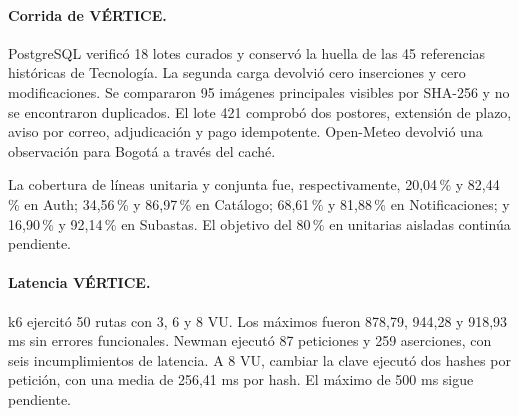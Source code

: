 \paragraph{Corrida de VÉRTICE.}
PostgreSQL verificó 18 lotes curados y conservó la huella de las 45 referencias históricas de Tecnología. La segunda carga devolvió cero inserciones y cero modificaciones. Se compararon 95 imágenes principales visibles por SHA-256 y no se encontraron duplicados. El lote 421 comprobó dos postores, extensión de plazo, aviso por correo, adjudicación y pago idempotente. Open-Meteo devolvió una observación para Bogotá a través del caché.

La cobertura de líneas unitaria y conjunta fue, respectivamente, 20,04\,\% y 82,44\,\% en Auth; 34,56\,\% y 86,97\,\% en Catálogo; 68,61\,\% y 81,88\,\% en Notificaciones; y 16,90\,\% y 92,14\,\% en Subastas. El objetivo del 80\,\% en unitarias aisladas continúa pendiente.

\paragraph{Latencia VÉRTICE.}
k6 ejercitó 50 rutas con 3, 6 y 8 VU. Los máximos fueron 878,79, 944,28 y 918,93 ms sin errores funcionales. Newman ejecutó 87 peticiones y 259 aserciones, con seis incumplimientos de latencia. A 8 VU, cambiar la clave ejecutó dos hashes por petición, con una media de 256,41 ms por hash. El máximo de 500 ms sigue pendiente.
